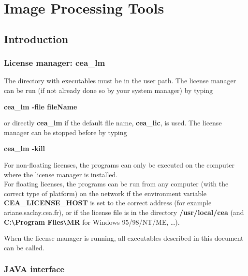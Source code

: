  

\chapter{\proj Image Processing Tools}
\label{ch_prog}


\section{Introduction}

\subsection{License manager: cea\_lm}
The directory with executables must be in the user path.  
The license manager can be run (if not already done so by your system manager)
by typing 
\begin{center}
 {\bf cea\_lm -file fileName}
 \end{center}
 or directly {\bf cea\_lm} if the default file name, {\bf cea\_lic}, is 
used. The license manager can be stopped before  by typing 
\begin{center}
 {\bf cea\_lm -kill}
 \end{center} 

For non-floating licenses, the programs
can only be executed on the computer where the  license manager is installed.\\
For floating licenses, the programs can be run from any computer (with the 
correct type of platform) on the network 
if the environment variable {\bf CEA\_LICENSE\_HOST} 
is set 
to the correct address (for example ariane.saclay.cea.fr), 
or if the license file is 
in the directory {\bf /usr/local/cea} 
(and {\bf  C:\verb+\+Program Files\verb+\+MR} for Windows 95/98/NT/ME, \dots).

When the license manager is running, all executables described in 
this document can be called.

\subsection{JAVA interface}
 
